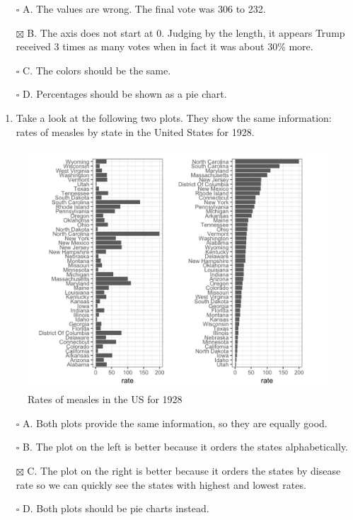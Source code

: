 \documentclass[
]{article}
\providecommand{\tightlist}{%
  \setlength{\itemsep}{0pt}\setlength{\parskip}{0pt}}
\begin{document}
\begin{itemize}
\tightlist
\item[$\square$]
  A. The values are wrong. The final vote was 306 to 232.
\item[$\boxtimes$]
  B. The axis does not start at 0. Judging by the length, it appears
  Trump received 3 times as many votes when in fact it was about 30\%
  more.
\item[$\square$]
  C. The colors should be the same.
\item[$\square$]
  D. Percentages should be shown as a pie chart.
\end{itemize}

\begin{enumerate}
\def\labelenumi{\arabic{enumi}.}
\setcounter{enumi}{2}
\tightlist
\item
  Take a look at the following two plots. They show the same
  information: rates of measles by state in the United States for 1928.
\end{enumerate}

\begin{figure}
\centering
\includegraphics{images/Rates of measles.png}
\caption{Rates of measles in the US for 1928}
\end{figure}

\begin{itemize}
\tightlist
\item[$\square$]
  A. Both plots provide the same information, so they are equally good.
\item[$\square$]
  B. The plot on the left is better because it orders the states
  alphabetically.
\item[$\boxtimes$]
  C. The plot on the right is better because it orders the states by
  disease rate so we can quickly see the states with highest and lowest
  rates.
\item[$\square$]
  D. Both plots should be pie charts instead.
\end{itemize}
\end{document}
